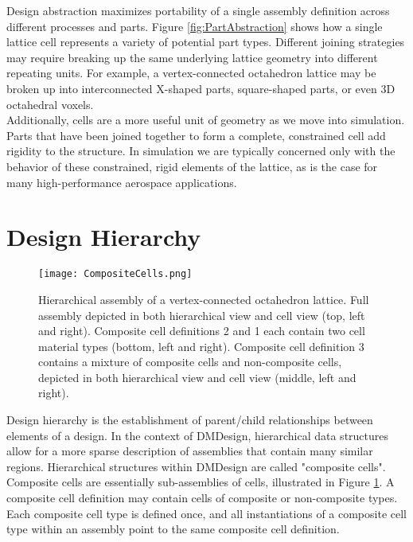 {Design abstraction maximizes portability of a single assembly definition across different processes and parts.  Figure \ref{fig:PartAbstraction} shows how a single lattice cell represents a variety of potential part types.  Different joining strategies may require breaking up the same underlying lattice geometry into different repeating units.  For example, a vertex-connected octahedron lattice may be broken up into interconnected X-shaped parts, square-shaped parts, or even 3D octahedral voxels.\\ 

Additionally, cells are a more useful unit of geometry as we move into simulation.  Parts that have been joined together to form a complete, constrained cell add rigidity to the structure.  In simulation we are typically concerned only with the behavior of these constrained, rigid elements of the lattice, as is the case for many high-performance aerospace applications.

\section{Design Hierarchy}

\begin{figure}
  \texttt{[image: CompositeCells.png]}
  \caption{Hierarchical assembly of a vertex-connected octahedron lattice.  Full assembly depicted in both hierarchical view and cell view (top, left and right).  Composite cell definitions 2 and 1 each contain two cell material types (bottom, left and right).  Composite cell definition 3 contains a mixture of composite cells and non-composite cells, depicted in both hierarchical view and cell view (middle, left and right).}
  \label{fig:CompositeCells}
\end{figure}

Design hierarchy is the establishment of parent/child relationships between elements of a design.  In the context of DMDesign, hierarchical data structures allow for a more sparse description of assemblies that contain many similar regions.  Hierarchical structures within DMDesign are called "composite cells".\\

Composite cells are essentially sub-assemblies of cells, illustrated in Figure \ref{fig:CompositeCells}.  A composite cell definition may contain cells of composite or non-composite types.  Each composite cell type is defined once, and all instantiations of a composite cell type within an assembly point to the same composite cell definition.\\

}
